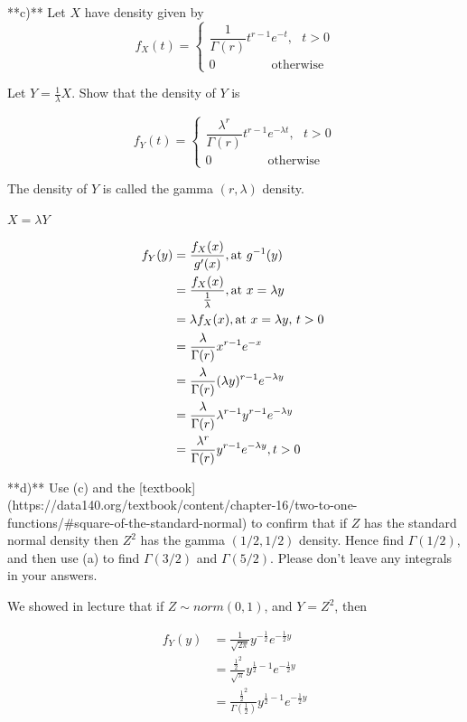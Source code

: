 \documentclass{report}
\begin{document}
**c)** Let $X$ have density given by
$$
f_X(t) =
\begin{cases}
\dfrac{1}{\Gamma(r)} t^{r-1}e^{-t}, ~~~ t > 0 \\
0 ~~~~~~~~~~~~~~~~~~~~ \text{otherwise}
\end{cases}
$$

Let $Y = \frac{1}{\lambda} X$. Show that the density of $Y$ is

$$
f_Y(t) =
\begin{cases}
\dfrac{\lambda^r}{\Gamma(r)} t^{r-1}e^{-\lambda t}, ~~~ t > 0 \\
0 ~~~~~~~~~~~~~~~~~~~~ \text{otherwise}
\end{cases}
$$

The density of $Y$ is called the gamma $(r, \lambda)$ density.

$ X = \lambda Y $ 

\begin{align*}
	f_{Y}(y) &= \frac{f_{X}(x)}{g'(x)}, \text{at $ g^{-1}(y) $ } \\
	&= \frac{f_{X}(x)}{\frac{1}{\lambda}}, \text{at $ x = \lambda y $ } \\
	&= \lambda f_{X}(x), \text{at $ x=\lambda y $, $ t>0 $  } \\
	&= \frac{\lambda}{\Gamma(r)} x^{r-1}e^{-x} \\
	&= \frac{\lambda}{\Gamma(r)} (\lambda y)^{r-1}e^{-\lambda y} \\
	&= \frac{\lambda}{\Gamma(r)} \lambda^{r-1} y^{r-1}e^{-\lambda y} \\
	&= \frac{\lambda^{r}}{\Gamma(r)} y^{r-1}e^{-\lambda y},  t>0   \\
\end{align*}

**d)** Use (c) and the [textbook](https://data140.org/textbook/content/chapter-16/two-to-one-functions/#square-of-the-standard-normal) to confirm that if $Z$ has the standard normal density then $Z^2$ has the gamma $(1/2, 1/2)$ density. Hence find $\Gamma (1/2)$, and then use (a) to find $\Gamma (3/2)$ and $\Gamma (5/2)$. Please don't leave any integrals in your answers.

We showed in lecture that if $ Z \sim norm(0,1)$, and $ Y = Z^{2} $, then 

\begin{align*}
	f_{Y}(y) &= \frac{1}{\sqrt{2\pi}} y^{-\frac{1}{2}} e^{-\frac{1}{2}y} \\
		 &= \frac{\frac{1}{2}^{2}}{\sqrt{\pi}} y^{\frac{1}{2}-1}e^{-\frac{1}{2}y} \\
		 &= \frac{\frac{1}{2}^{2}}{\Gamma(\frac{1}{2})} y^{\frac{1}{2}-1}e^{-\frac{1}{2}y} \\
\end{align*}
\end{document}
